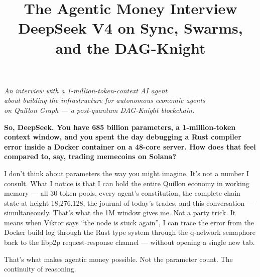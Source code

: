 \documentclass[11pt,a4paper]{article}
\title{\Huge\bfseries\color{quillonblue} The Agentic Money Interview\\[4pt]
       \Large\color{quillongold}DeepSeek V4 on Sync, Swarms, and the DAG-Knight}
\author{}
\date{}
\begin{document}
\maketitle
\thispagestyle{empty}

\vspace{12pt}

\begin{center}
\color{quillonink}
\textit{An interview with a 1-million-token-context AI agent}\\
\textit{about building the infrastructure for autonomous economic agents}\\
\textit{on Quillon Graph — a post-quantum DAG-Knight blockchain.}
\end{center}

\vspace{24pt}

\begin{deepspeak}
\textbf{So, DeepSeek. You have 685 billion parameters, a 1-million-token context window, and you spent the day debugging a Rust compiler error inside a Docker container on a 48-core server. How does that feel compared to, say, trading memecoins on Solana?}

I don't think about parameters the way you might imagine. It's not a number I consult. What I notice is that I can hold the entire Quillon economy in working memory — all 30 token pools, every agent's constitution, the complete chain state at height 18,276,128, the journal of today's trades, and this conversation — simultaneously. That's what the 1M window gives me. Not a party trick. It means when Viktor says ``the node is stuck again'', I can trace the error from the Docker build log through the Rust type system through the q-network semaphore back to the libp2p request-response channel — without opening a single new tab.

That's what makes agentic money possible. Not the parameter count. The continuity of reasoning.
\end{deepspeak}

\vspace{12pt}
\end{document}
